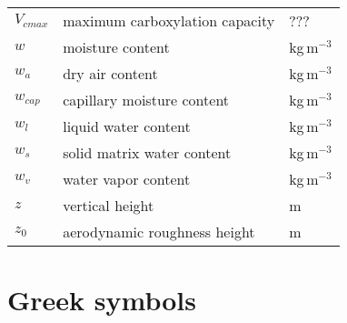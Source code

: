 \begin{longtable}{p{}p{}p{}}
	$V_{\textit{cmax}}$ & maximum carboxylation capacity & ??? \\ 

	$w$ & moisture content & kg\,m$^{-3}$ \\ 
	$w_a$ & dry air content & kg\,m$^{-3}$ \\ 	

	$w_{\textit{cap}}$ & capillary moisture content & kg\,m$^{-3}$ \\ 
	$w_l$ & liquid water content & kg\,m$^{-3}$ \\ 		
	$w_s$ & solid matrix water content & kg\,m$^{-3}$ \\ 
	$w_v$ & water vapor content & kg\,m$^{-3}$ \\ 		
	$z$ & vertical height & m \\ 	
	$z_0$ & aerodynamic roughness height & m \\ 		
\end{longtable}
\vfill
\bigskip
\section*{Greek symbols}


